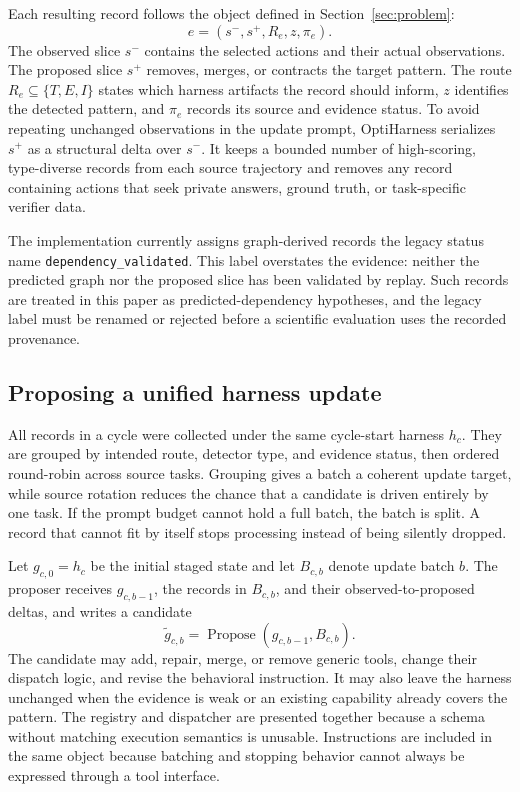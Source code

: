 Each resulting record follows the object defined in Section~\ref{sec:problem}:
\begin{equation}
    e=(s^{-},s^{+},R_e,z,\pi_e).
\end{equation}
The observed slice $s^{-}$ contains the selected actions and their actual observations. The proposed slice $s^{+}$ removes, merges, or contracts the target pattern. The route $R_e\subseteq\{T,E,I\}$ states which harness artifacts the record should inform, $z$ identifies the detected pattern, and $\pi_e$ records its source and evidence status. To avoid repeating unchanged observations in the update prompt, OptiHarness serializes $s^{+}$ as a structural delta over $s^{-}$. It keeps a bounded number of high-scoring, type-diverse records from each source trajectory and removes any record containing actions that seek private answers, ground truth, or task-specific verifier data.

The implementation currently assigns graph-derived records the legacy status name \texttt{dependency\_validated}. This label overstates the evidence: neither the predicted graph nor the proposed slice has been validated by replay. Such records are treated in this paper as predicted-dependency hypotheses, and the legacy label must be renamed or rejected before a scientific evaluation uses the recorded provenance.

\subsection{Proposing a unified harness update}

All records in a cycle were collected under the same cycle-start harness $h_c$. They are grouped by intended route, detector type, and evidence status, then ordered round-robin across source tasks. Grouping gives a batch a coherent update target, while source rotation reduces the chance that a candidate is driven entirely by one task. If the prompt budget cannot hold a full batch, the batch is split. A record that cannot fit by itself stops processing instead of being silently dropped.

Let $g_{c,0}=h_c$ be the initial staged state and let $B_{c,b}$ denote update batch $b$. The proposer receives $g_{c,b-1}$, the records in $B_{c,b}$, and their observed-to-proposed deltas, and writes a candidate
\begin{equation}
    \widetilde g_{c,b}=\operatorname{Propose}(g_{c,b-1},B_{c,b}).
\end{equation}
The candidate may add, repair, merge, or remove generic tools, change their dispatch logic, and revise the behavioral instruction. It may also leave the harness unchanged when the evidence is weak or an existing capability already covers the pattern. The registry and dispatcher are presented together because a schema without matching execution semantics is unusable. Instructions are included in the same object because batching and stopping behavior cannot always be expressed through a tool interface.

